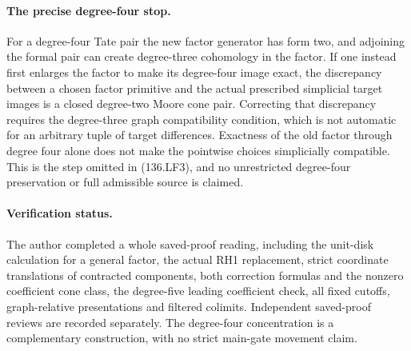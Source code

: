 \paragraph{The precise degree-four stop.}
For a degree-four Tate pair the new factor generator has form
two, and adjoining the formal pair can create degree-three
cohomology in the factor. If one instead first enlarges the
factor to make its degree-four image exact, the discrepancy
between a chosen factor primitive and the actual prescribed
simplicial target images is a closed degree-two Moore cone pair.
Correcting that discrepancy requires the degree-three graph
compatibility condition, which is not automatic for an arbitrary
tuple of target differences. Exactness of the old factor through
degree four alone does not make the pointwise choices simplicially
compatible. This is the step omitted in (136.LF3), and no
unrestricted degree-four preservation or full admissible source
is claimed.

\paragraph{Verification status.}
The author completed a whole saved-proof reading, including the
unit-disk calculation for a general factor, the actual RH1 replacement,
strict coordinate translations of contracted components, both correction
formulas and the nonzero coefficient cone class, the degree-five leading
coefficient check, all fixed cutoffs, graph-relative presentations and
filtered colimits. Independent saved-proof reviews are recorded separately.
The degree-four concentration is a complementary construction, with no
strict main-gate movement claim.
